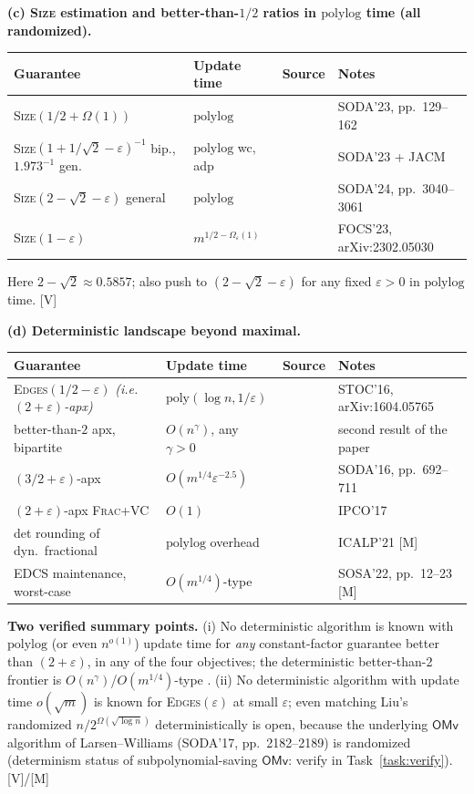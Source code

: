 \documentclass[11pt]{article}
\theoremstyle{definition}
\theoremstyle{remark}
\newcommand{\statusV}{\textcolor{green!45!black}{\textsf{[V]}}}
\newcommand{\statusM}{\textcolor{orange!80!black}{\textsf{[M]}}}
\newcommand{\poly}{\mathrm{poly}}
\newcommand{\polylog}{\mathrm{polylog}}
\newcommand{\OMv}{\mathsf{OMv}}
\newcommand{\eps}{\varepsilon}
\begin{document}
\medskip
\noindent\textbf{(c) \textsc{Size} estimation and better-than-$1/2$
ratios in $\polylog$ time (all randomized).}
\begin{center}
\small
\begin{tabular}{@{}llll@{}}
\toprule
Guarantee & Update time & Source & Notes\\
\midrule
\textsc{Size}$(1/2+\Omega(1))$ & $\polylog$ & \cite{Beh23} & SODA'23, pp.~129--162\\
\textsc{Size}$(1+1/\sqrt2-\eps)^{-1}$ bip., $1.973^{-1}$ gen. & $\polylog$ wc, adp & \cite{BKSW23} & SODA'23 + JACM\\
\textsc{Size}$(2-\sqrt2-\eps)$ general & $\polylog$ & \cite{ABR24} & SODA'24, pp.~3040--3061\\
\textsc{Size}$(1-\eps)$ & $m^{1/2-\Omega_{\eps}(1)}$ & \cite{BKS23} & FOCS'23, arXiv:2302.05030\\
\bottomrule
\end{tabular}
\end{center}
Here $2-\sqrt2\approx 0.5857$; \cite{ABR24} also push to
$(2-\sqrt2-\eps)$ for any fixed $\eps>0$ in $\polylog$ time. \statusV

\medskip
\noindent\textbf{(d) Deterministic landscape beyond maximal.}
\begin{center}
\small
\begin{tabular}{@{}llll@{}}
\toprule
Guarantee & Update time & Source & Notes\\
\midrule
\textsc{Edges}$(1/2-\eps)$ \emph{(i.e.\ $(2{+}\eps)$-apx)} & $\poly(\log n,1/\eps)$ & \cite{BHN16} & STOC'16, arXiv:1604.05765\\
better-than-$2$ apx, bipartite & $O(n^{\gamma})$, any $\gamma>0$ & \cite{BHN16} & second result of the paper\\
$(3/2+\eps)$-apx & $O(m^{1/4}\eps^{-2.5})$ & \cite{BS16} & SODA'16, pp.~692--711\\
$(2+\eps)$-apx \textsc{Frac}+VC & $O(1)$ & \cite{BCH17} & IPCO'17\\
det rounding of dyn.\ fractional & $\polylog$ overhead & \cite{BK21} & ICALP'21 \statusM\\
EDCS maintenance, worst-case & $O(m^{1/4})$-type & \cite{GSSU22} & SOSA'22, pp.~12--23 \statusM\\
\bottomrule
\end{tabular}
\end{center}

\noindent\textbf{Two verified summary points.} (i) No deterministic
algorithm is known with $\polylog$ (or even $n^{o(1)}$) update time for
\emph{any} constant-factor guarantee better than $(2+\eps)$, in any of
the four objectives; the deterministic better-than-2 frontier is
$O(n^{\gamma})$/$O(m^{1/4})$-type \cite{BHN16,BS16}. (ii) No
deterministic algorithm with update time $o(\sqrt m)$ is known for
\textsc{Edges}$(\eps)$ at small $\eps$; even matching Liu's randomized
$n/2^{\Omega(\sqrt{\log n})}$ deterministically is open, because the
underlying $\OMv$ algorithm of Larsen--Williams \cite{LW17} (SODA'17,
pp.~2182--2189) is randomized (determinism status of subpolynomial-saving
$\OMv$: verify in Task~\ref{task:verify}). \statusV/\statusM
\end{document}
